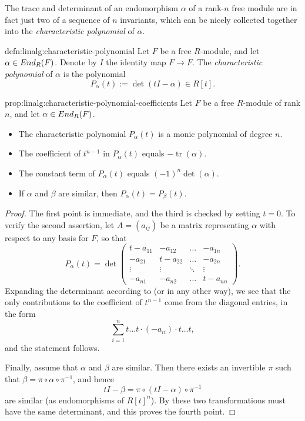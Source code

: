 The trace and determinant of an endomorphism $\alpha$ of a rank-$n$
free module are in fact just two of a sequence of $n$ invariants,
which can be nicely collected together into the \emph{characteristic
  polynomial} of $\alpha$.
\begin{defn}{}{defn:linalg:characteristic-polynomial}
  Let $F$ be a free $R$-module, and let $\alpha \in End_R(F)$. Denote
  by $I$ the identity map $F \to F$. The \emph{characteristic
    polynomial} of $\alpha$ is the polynomial
  \[
    P_\alpha(t) := \det(tI - \alpha) \in R[t].
  \]
\end{defn}
\begin{prop}{}{prop:linalg:characteristic-polynomial-coefficients}
  Let $F$ be a free $R$-module of rank $n$, and let
  $\alpha \in End_R(F)$.
  \begin{itemize}
  \item The characteristic polynomial $P_\alpha(t)$ is a monic
    polynomial of degree $n$.
  \item The coefficient of $t^{n-1}$ in $P_\alpha(t)$ equals
    $-\operatorname{tr}(\alpha)$.
  \item The constant term of $P_\alpha(t)$ equals
    $(-1)^n \det(\alpha)$.
  \item If $\alpha$ and $\beta$ are similar, then
    $P_\alpha(t) = P_\beta(t)$.
  \end{itemize}
\end{prop}
\begin{proof}
  The first point is immediate, and the third is checked by setting
  $t = 0$. To verify the second assertion, let $A = (a_{ij})$ be a
  matrix representing $\alpha$ with respect to any basis for $F$, so
  that
  \[
    P_\alpha(t) = \det
    \begin{pmatrix}
      t-a_{11} & -a_{12} & \dots & -a_{1n} \\
      -a_{21} & t-a_{22} & \dots & -a_{2n} \\
      \vdots & \vdots & \ddots & \vdots \\
      -a_{n1} & -a_{n2} & \dots & t-a_{nn}
    \end{pmatrix}.
  \]
  Expanding the determinant according to  (or in any
  other way), we see that the only contributions to the coefficient of
  $t^{n-1}$ come from the diagonal entries, in the form
  \[
    \sum_{i=1}^n t \dots t \cdot (-a_{ii}) \cdot t \dots t,
  \]
  and the statement follows.

  Finally, assume that $\alpha$ and $\beta$ are similar. Then there
  exists an invertible $\pi$ such that
  $\beta = \pi \circ \alpha \circ \pi^{-1}$, and hence
  \[
    tI - \beta = \pi \circ (tI - \alpha) \circ \pi^{-1}
  \]
  are similar (as endomorphisms of $R[t]^n$). By
   these two
  transformations must have the same determinant, and this proves the
  fourth point.
\end{proof}

